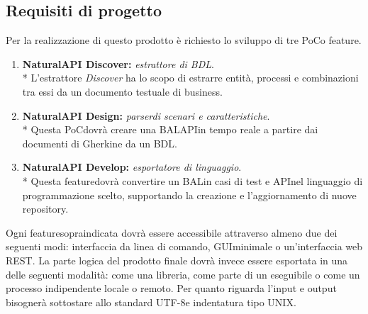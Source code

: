 \subsection{Requisiti di progetto}
Per la realizzazione di questo prodotto è richiesto lo sviluppo di tre PoC\glosp o feature\glo.
\begin{enumerate}
	\item \textbf{NaturalAPI Discover: }\textit{estrattore di BDL\glo}. \\*
	L'estrattore \textit{Discover} ha lo scopo di estrarre entità, processi e combinazioni tra essi da un documento testuale di business.
	\item \textbf{NaturalAPI Design: }\textit{parser\glosp di scenari e caratteristiche}. \\*
	Questa PoC\glosp dovrà creare una BAL\glosp API\glosp in tempo reale a partire dai documenti di Gherkin\glosp e da un BDL\glo.
	\item \textbf{NaturalAPI Develop: }\textit{esportatore di linguaggio}. \\* 
	Questa feature\glosp dovrà convertire un BAL\glosp in casi di test e API\glosp nel linguaggio di programmazione scelto, supportando la creazione e l'aggiornamento di nuove repository\glo.
\end{enumerate}
Ogni feature\glosp sopraindicata dovrà essere accessibile attraverso almeno due dei seguenti modi: interfaccia da linea di comando, GUI\glosp minimale o un'interfaccia web REST\glo. La parte logica del prodotto finale dovrà invece essere esportata in una delle seguenti modalità: come una libreria, come parte di un eseguibile o come un processo indipendente locale o remoto. 
Per quanto riguarda l'input e output bisognerà sottostare allo standard UTF-8\glosp e indentatura tipo UNIX\glo. 

